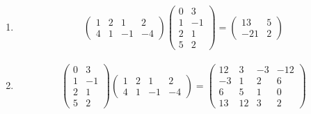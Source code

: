 \documentclass[solution]{tudexercise}
\begin{document}
\begin{enumerate}
				\item
				\begin{align*}
\begin{pmatrix}
1 & 2 & 1 & 2\\
4 & 1 & -1 & -4
\end{pmatrix}\begin{pmatrix}
0 & 3\\
1 & -1\\
2 & 1\\
5 & 2
\end{pmatrix} = \begin{pmatrix}
13 & 5\\
-21 & 2
\end{pmatrix}
				\end{align*}
				
				\item
				\begin{align*}
\begin{pmatrix}
0 & 3\\
1 & -1\\
2 & 1\\
5 & 2
\end{pmatrix}\begin{pmatrix}
1 & 2 & 1 & 2\\
4 & 1 & -1 & -4
\end{pmatrix} = \begin{pmatrix}
12 & 3 & -3 & -12\\
-3 & 1 & 2 & 6\\
6 & 5 & 1 & 0\\
13 & 12 & 3 & 2
\end{pmatrix}
				\end{align*}
				\end{enumerate}
	
	
	
\end{document}

